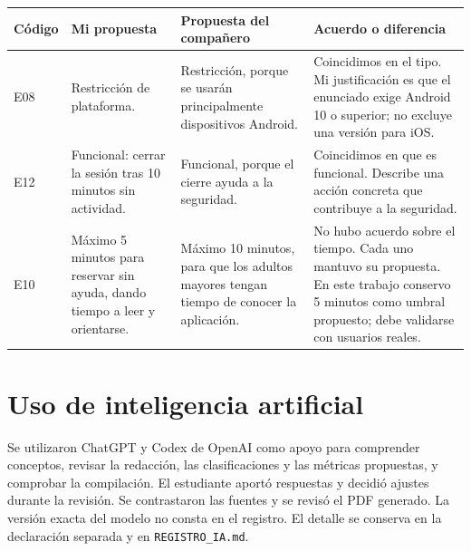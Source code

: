\documentclass[11pt,a4paper]{article}
\begin{document}
\begingroup\small
\begin{longtable}{|L{1.4cm}|L{3.0cm}|L{3.0cm}|L{5.2cm}|}
\hline
\textbf{Código} & \textbf{Mi propuesta} & \textbf{Propuesta del compañero} & \textbf{Acuerdo o diferencia} \\\hline
E08 & Restricción de plataforma. & Restricción, porque se usarán principalmente dispositivos Android. & Coincidimos en el tipo. Mi justificación es que el enunciado exige Android 10 o superior; no excluye una versión para iOS. \\\hline
E12 & Funcional: cerrar la sesión tras 10 minutos sin actividad. & Funcional, porque el cierre ayuda a la seguridad. & Coincidimos en que es funcional. Describe una acción concreta que contribuye a la seguridad. \\\hline
E10 & Máximo 5 minutos para reservar sin ayuda, dando tiempo a leer y orientarse. & Máximo 10 minutos, para que los adultos mayores tengan tiempo de conocer la aplicación. & No hubo acuerdo sobre el tiempo. Cada uno mantuvo su propuesta. En este trabajo conservo 5 minutos como umbral propuesto; debe validarse con usuarios reales. \\\hline
\end{longtable}
\endgroup

\section{Uso de inteligencia artificial}

Se utilizaron ChatGPT y Codex de OpenAI como apoyo para comprender conceptos, revisar la redacción, las clasificaciones y las métricas propuestas, y comprobar la compilación. El estudiante aportó respuestas y decidió ajustes durante la revisión. Se contrastaron las fuentes y se revisó el PDF generado. La versión exacta del modelo no consta en el registro. El detalle se conserva en la declaración separada y en \texttt{REGISTRO\_IA.md}.

\clearpage


\end{document}
